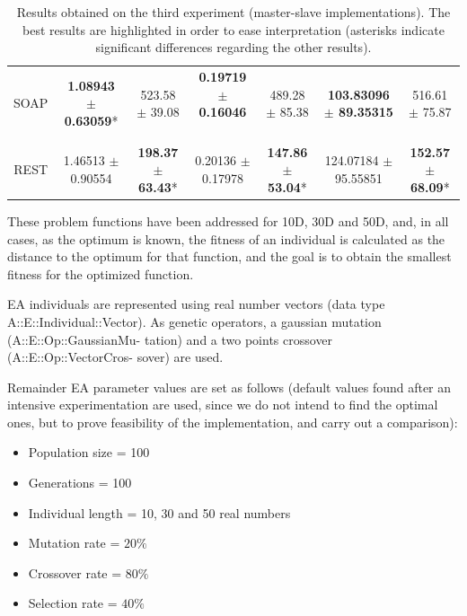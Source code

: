 \documentclass[final,1p,times]{elsarticle}
\begin{document}
\begin{table}[!ht]
{\begin{tabular}{|c|c|c||c|c||c|c|}
\cline{2-7}
 SOAP  & \textbf{1.08943 $\pm$ 0.63059}* &  523.58 $\pm$ 39.08 &  \textbf{0.19719 $\pm$ 0.16046} \ \  & 489.28 $\pm$ 85.38 &  \textbf{103.83096 $\pm$ 89.35315} & 516.61 $\pm$ 75.87  \\
 REST  & 1.46513 $\pm$ 0.90554 &  \textbf{198.37 $\pm$ 63.43}* &  0.20136 $\pm$ 0.17978  & \textbf{147.86 $\pm$ 53.04}* &  124.07184 $\pm$ 95.55851 & \textbf{152.57 $\pm$ 68.09}*  \\
\hline
\end{tabular}
}

\caption{Results obtained on the third experiment (master-slave implementations). The best results are highlighted in order to ease interpretation (asterisks indicate significant differences regarding the other results). 
\label{tabla:expREVIEW} }

\end{table}



These problem functions have been addressed for 10D, 30D and 50D, and, in all cases, as the optimum is known, the fitness of an individual is calculated as the distance to the optimum for that function, and the goal is to obtain the smallest fitness for the optimized function.


EA individuals are represented using real number vectors (data type {\sf A::E::Individual::Vector}). 
As genetic operators, a gaussian mutation ({\sf A::E::Op::GaussianMu- tation}) and a two points crossover ({\sf A::E::Op::VectorCros- sover}) are used.

Remainder EA parameter values are set as follows (default values found after an intensive experimentation are used, since we do not intend to find the optimal ones, but to prove feasibility of the implementation, and carry out a comparison):

\begin{itemize}
   \item Population size = 100
   \item Generations = 100
   \item Individual length = 10, 30 and 50 real numbers
   \item Mutation rate = $20\%$
   \item Crossover rate = $80\%$
   \item Selection rate = $40\%$
\end{itemize}
\end{document}
